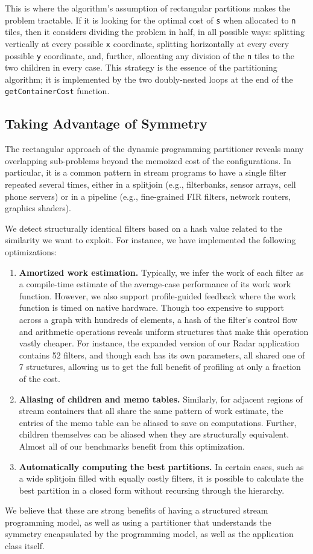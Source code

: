 This is where the algorithm's assumption of rectangular partitions
makes the problem tractable.  If it is looking for the optimal cost of
{\tt s} when allocated to {\tt n} tiles, then it considers dividing
the problem in half, in all possible ways: splitting vertically at
every possible {\tt x} coordinate, splitting horizontally at every
every possible {\tt y} coordinate, and, further, allocating any
division of the {\tt n} tiles to the two children in every case.  This
strategy is the essence of the partitioning algorithm; it is
implemented by the two doubly-nested loops at the end of the {\tt
getContainerCost} function.

\subsection{Taking Advantage of Symmetry}

The rectangular approach of the dynamic programming partitioner
reveals many overlapping sub-problems beyond the memoized cost of the
configurations.  In particular, it is a common pattern in stream
programs to have a single filter repeated several times, either in a
splitjoin (e.g., filterbanks, sensor arrays, cell phone servers) or in
a pipeline (e.g., fine-grained FIR filters, network routers, graphics
shaders).  

We detect structurally identical filters based on a hash value related
to the similarity we want to exploit.  For instance, we have
implemented the following optimizations:
\begin{enumerate}

\item {\bf Amortized work estimation.}  Typically, we infer the work
of each filter as a compile-time estimate of the average-case
performance of its work work function.  However, we also support
profile-guided feedback where the work function is timed on native
hardware.  Though too expensive to support across a graph with
hundreds of elements, a hash of the filter's control flow and
arithmetic operations reveals uniform structures that make this
operation vastly cheaper.  For instance, the expanded version of our
Radar application contains 52 filters, and though each has its own
parameters, all shared one of 7 structures, allowing us to get the
full benefit of profiling at only a fraction of the cost.

\item {\bf Aliasing of children and memo tables.}  Similarly, for
adjacent regions of stream containers that all share the same pattern
of work estimate, the entries of the memo table can be aliased to save
on computations.  Further, children themselves can be aliased when
they are structurally equivalent.  Almost all of our benchmarks
benefit from this optimization.

\item {\bf Automatically computing the best partitions.}  In certain
cases, such as a wide splitjoin filled with equally costly filters, it
is possible to calculate the best partition in a closed form without
recursing through the hierarchy.
\end{enumerate}

We believe that these are strong benefits of having a structured
stream programming model, as well as using a partitioner that
understands the symmetry encapsulated by the programming model, as
well as the application class itself.
